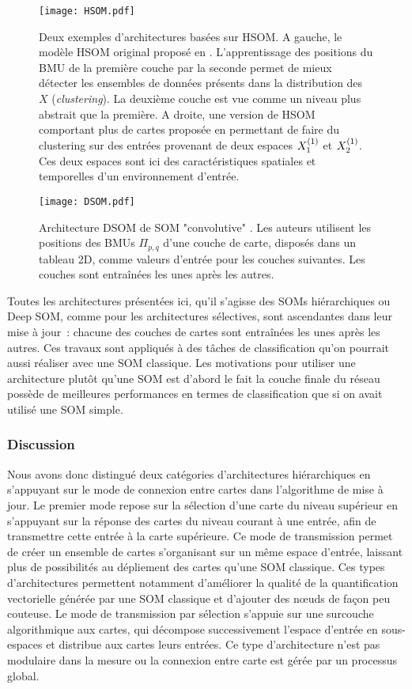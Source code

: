 \documentclass[../main]{subfiles}
\begin{document}
\begin{figure}[t]
    \centering
    \texttt{[image: HSOM.pdf]}
    \caption{Deux exemples d'architectures basées sur HSOM. A gauche, le modèle HSOM original proposé en \cite{lampinen_clustering_1992}. L'apprentissage des positions du BMU de la première couche par la seconde permet de mieux détecter les ensembles de données présents dans la distribution des $X$ (\emph{clustering}).
    La deuxième couche est vue comme un niveau plus abstrait que la première. 
    A droite, une version de HSOM comportant plus de cartes proposée en \cite{hagenauer_hierarchical_2013} permettant de faire du clustering sur des entrées provenant de deux espaces $X_1^{({1})}$ et $X_2^{({1})}$. Ces deux espaces sont ici des caractéristiques spatiales et temporelles d'un environnement d'entrée.
    \label{fig:hsom}}
\end{figure}

\begin{figure}[t]
    \texttt{[image: DSOM.pdf]}
    \caption{Architecture DSOM de SOM "convolutive" \cite{liu_deep_2015}. Les auteurs utilisent les positions des BMUs $\Pi_{p,q}$ d'une couche de carte, disposés dans un tableau 2D, comme valeurs d'entrée pour les couches suivantes. Les couches sont entraînées les unes après les autres. \label{fig:dsom}}
\end{figure}

Toutes les architectures présentées ici, qu'il s'agisse des SOMs hiérarchiques ou Deep SOM, comme pour les architectures sélectives, sont ascendantes dans leur mise à jour~: chacune des couches de cartes sont entraînées les unes après les autres. 
Ces travaux sont appliqués à des tâches de classification qu'on pourrait aussi réaliser avec une SOM classique.
Les motivations pour utiliser une architecture plutôt qu'une SOM est d'abord le fait la couche finale du réseau possède de meilleures performances en termes de classification que si on avait utilisé une SOM simple.

\subsubsection{Discussion}

Nous avons donc distingué deux catégories d'architectures hiérarchiques en s'appuyant sur le mode de connexion entre cartes dans l'algorithme de mise à jour. 
Le premier mode repose sur la sélection d'une carte du niveau supérieur en s'appuyant sur la réponse des cartes du niveau courant à une entrée, afin de transmettre cette entrée à la carte supérieure. Ce mode de transmission permet de créer un ensemble de cartes s'organisant sur un même espace d'entrée, laissant plus de possibilités au dépliement des cartes qu'une SOM classique. Ces types d'architectures permettent notamment d'améliorer la qualité de la quantification vectorielle générée par une SOM classique et d'ajouter des n\oe{}uds de façon peu couteuse. Le mode de transmission par sélection s'appuie sur une surcouche algorithmique aux cartes, qui décompose successivement l'espace d'entrée en sous-espaces et distribue aux cartes leurs entrées. Ce type d'architecture n'est pas modulaire dans la mesure ou la connexion entre carte est gérée par un processus global.
\end{document}
